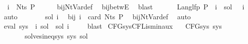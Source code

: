 \begin{isabellebody}
\ {\isachardoublequoteopen}{\isasymgamma}\ i\ {\isasymin}\ Nts\ P{\isachardoublequoteclose}\isanewline
\ \ \ \ \isamarkupfalse%
\ bij{\isacharunderscore}{\kern0pt}Nt{\isacharunderscore}{\kern0pt}Var{\isacharunderscore}{\kern0pt}def\ \isamarkupfalse%
\ bij{\isacharunderscore}{\kern0pt}betwE\ \isamarkupfalse%
\ blast\isanewline
\ \ \isamarkupfalse%
\ {\isacharasterisk}{\kern0pt}\ \isamarkupfalse%
\ {\isachardoublequoteopen}Lang{\isacharunderscore}{\kern0pt}lfp\ P\ {\isacharparenleft}{\kern0pt}{\isasymgamma}\ i{\isacharparenright}{\kern0pt}\ {\isacharequal}{\kern0pt}\ sol\ {\isacharparenleft}{\kern0pt}{\isasymgamma}{\isacharprime}{\kern0pt}\ {\isacharparenleft}{\kern0pt}{\isasymgamma}\ i{\isacharparenright}{\kern0pt}{\isacharparenright}{\kern0pt}{\isachardoublequoteclose}\ \isamarkupfalse%
\ auto\isanewline
\ \ \isamarkupfalse%
\ \isamarkupfalse%
\ {\isachardoublequoteopen}{\isasymdots}\ {\isacharequal}{\kern0pt}\ sol\ i{\isachardoublequoteclose}\ \isamarkupfalse%
\ bij{\isacharunderscore}{\kern0pt}{\isasymgamma}{\isacharunderscore}{\kern0pt}{\isasymgamma}{\isacharprime}{\kern0pt}\ {\isacartoucheopen}i\ {\isacharless}{\kern0pt}\ card\ {\isacharparenleft}{\kern0pt}Nts\ P{\isacharparenright}{\kern0pt}{\isacartoucheclose}\ \isamarkupfalse%
\ bij{\isacharunderscore}{\kern0pt}Nt{\isacharunderscore}{\kern0pt}Var{\isacharunderscore}{\kern0pt}def\ \isamarkupfalse%
\ auto\isanewline
\ \ \isamarkupfalse%
\ \isamarkupfalse%
\ {\isachardoublequoteopen}eval\ {\isacharparenleft}{\kern0pt}sys\ {\isacharbang}{\kern0pt}\ i{\isacharparenright}{\kern0pt}\ sol\ {\isasymsubseteq}\ sol\ i{\isachardoublequoteclose}\ \isamarkupfalse%
\ {}\ \isamarkupfalse%
\ blast\isanewline
{}\isamarkupfalse%
%
\endisatagproof
{\isafoldproof}%
%
\isadelimproof
\isanewline
%
\endisadelimproof
\isanewline
{}\isamarkupfalse%
\ CFG{\isacharunderscore}{\kern0pt}sys{\isacharunderscore}{\kern0pt}CFL{\isacharunderscore}{\kern0pt}is{\isacharunderscore}{\kern0pt}min{\isacharunderscore}{\kern0pt}aux{\isacharcolon}{\kern0pt}\isanewline
\ \ \ {\isachardoublequoteopen}CFG{\isacharunderscore}{\kern0pt}sys\ sys{\isachardoublequoteclose}\isanewline
\ \ \ \ \ \ \ {\isachardoublequoteopen}solves{\isacharunderscore}{\kern0pt}ineq{\isacharunderscore}{\kern0pt}sys\ sys\ sol{\isacharprime}{\kern0pt}{\isachardoublequoteclose}\isanewline

\end{isabellebody}
